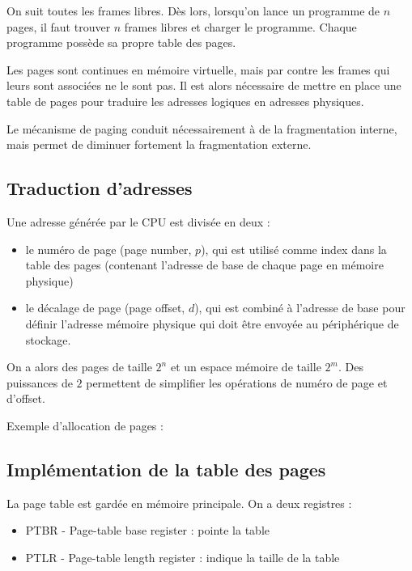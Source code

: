 On suit toutes les frames libres. Dès lors, lorsqu'on lance un programme de $n$ pages, il faut trouver $n$ frames libres et charger le programme. Chaque programme possède sa propre table des pages.

Les pages sont continues en mémoire virtuelle, mais par contre les frames qui leurs sont associées ne le sont pas. Il est alors nécessaire de mettre en place une table de pages pour traduire les adresses logiques en adresses physiques.

Le mécanisme de paging conduit nécessairement à de la fragmentation interne, mais permet de diminuer fortement la fragmentation externe.

	\subsection{Traduction d'adresses}
	
	Une adresse générée par le CPU est divisée en deux :
	
	\begin{itemize}
		\item le numéro de page (page number, $p$), qui est utilisé comme index dans la table des pages (contenant l'adresse de base de chaque page en mémoire physique)
		\item le décalage de page (page offset, $d$), qui est combiné à l'adresse de base pour définir l'adresse mémoire physique qui doit être envoyée au périphérique de stockage.
	\end{itemize}
	
	
	On a alors des pages de taille $2^n$ et un espace mémoire de taille $2^m$. Des puissances de $2$ permettent de simplifier les opérations de numéro de page et d'offset.
	
	
	Exemple d'allocation de pages :
	
	
	\subsection{Implémentation de la table des pages}
	
	La page table est gardée en mémoire principale. On a deux registres :
	
	\begin{itemize}
		\item PTBR - Page-table base register : pointe la table
		\item PTLR - Page-table length register : indique la taille de la table
	\end{itemize}
	
